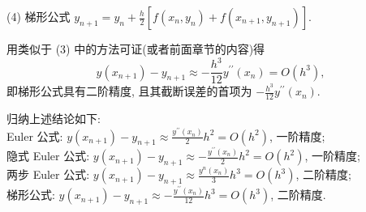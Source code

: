 (4) 梯形公式 $y_{n+1}=y_{n}+\frac{h}{2}\left[f\left(x_{n}, y_{n}\right)+f\left(x_{n+1}, y_{n+1}\right)\right] .$

用类似于 (3) 中的方法可证(或者前面章节的内容)得
$$
y\left(x_{n+1}\right)-y_{n+1} \approx-\frac{h^{3}}{12} y^{\prime \prime}\left(x_{n}\right)=O\left(h^{3}\right),
$$
即梯形公式具有二阶精度, 且其截断误差的首项为 $ -\frac{h^{3}}{12} y^{\prime \prime}\left(x_{n}\right) $.

归纳上述结论如下:\\
Euler 公式: $ y\left(x_{n+1}\right)-y_{n+1} \approx \frac{y^{\prime \prime}\left(x_{n}\right)}{2} h^{2}=O\left(h^{2}\right) $, 一阶精度;\\
隐式 Euler 公式: $ y\left(x_{n+1}\right)-y_{n+1} \approx-\frac{y^{\prime \prime}\left(x_{n}\right)}{2} h^{2}=O\left(h^{2}\right) $, 一阶精度;\\
两步 Euler 公式: $ y\left(x_{n+1}\right)-y_{n+1} \approx \frac{y^{n}\left(x_{n}\right)}{3} h^{3}=O\left(h^{3}\right) $, 二阶精度;\\
梯形公式: $ y\left(x_{n+1}\right)-y_{n+1} \approx-\frac{y^{\prime \prime}\left(x_{n}\right)}{12} h^{3}=O\left(h^{3}\right) $, 二阶精度.